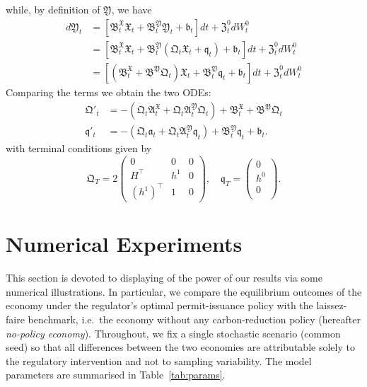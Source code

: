 \documentclass[11pt,twoside]{amsart}
\theoremstyle{definition}
\numberwithin{equation}{section}
\begin{document}
while, by definition of $\mathfrak{Y}$, we have 
\begin{align*}
d\mathfrak{Y}_t &=[\mathfrak{B}^{\mathfrak{X}}_t\mathfrak{X}_t + \mathfrak{B}^{\mathfrak{Y}}_t\mathfrak{Y}_t + \mathfrak{b}_t ] dt + \mathfrak{Z}^0_tdW^0_t\\
&= [\mathfrak{B}^{\mathfrak{X}}_t\mathfrak{X}_t + \mathfrak{B}^{\mathfrak{Y}}_t(\mathfrak{Q}_t \mathfrak{X}_t + \mathfrak{q}_t) + \mathfrak{b}_t ] dt + \mathfrak{Z}^0_tdW^0_t\\
&= [(\mathfrak{B}^{\mathfrak{X}}_t + \mathfrak{B}^{\mathfrak{Y}}\mathfrak{Q}_t) \mathfrak{X}_t + \mathfrak{B}^{\mathfrak{Y}}_t \mathfrak{q}_t + \mathfrak{b}_t ] dt + \mathfrak{Z}^0_t dW^0_t
\end{align*}
Comparing the terms we obtain the two ODEs:
\begin{align*}
    \mathfrak{Q}'_t &= -(\mathfrak{Q}_t \mathfrak{A}^{\mathfrak{X}}_t + \mathfrak{Q}_t \mathfrak{A}^{\mathfrak{Y}}_t \mathfrak{Q}_t) + \mathfrak{B}^{\mathfrak{X}}_t +\mathfrak{B}^{\mathfrak{Y}}\mathfrak{Q}_t\\
    \mathfrak{q}'_t &= - ( \mathfrak{Q}_t \mathfrak{a}_t + \mathfrak{Q}_t \mathfrak{A}^{\mathfrak{Y}}_t \mathfrak{q}_t ) + \mathfrak{B}^{\mathfrak{Y}}_t \mathfrak{q}_t +\mathfrak{b}_t.
\end{align*}
with terminal conditions given by
\begin{equation*}
\mathfrak{Q}_T
= 2\begin{pmatrix}
    0 & 0 & 0\\
    H^\top & h^1 & 0\\ 
    (h^1)^\top & 1 &0
\end{pmatrix}, \quad \mathfrak{q}_T 
= \begin{pmatrix}
    0  \\
    h^0\\
    0 \\
\end{pmatrix}.
\end{equation*}

\section{Numerical Experiments}\label{section: numerical_experiments}

This section is devoted to displaying of the power of our results via some numerical illustrations. 
In particular, we compare the equilibrium outcomes of the economy under the regulator's optimal permit-issuance policy with the laissez-faire benchmark, i.e.\ the economy without any carbon-reduction policy (hereafter \emph{no-policy economy}). 
Throughout, we fix a single stochastic scenario (common seed) so that all differences between the two economies are attributable solely to the regulatory intervention and not to sampling variability. The model parameters are summarised in Table~\ref{tab:params}. 
\end{document}
